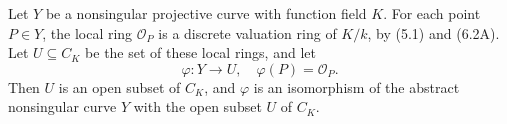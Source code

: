 Let $Y$ be a nonsingular projective curve with function field $K$. For each point $P \in Y$, the local ring $\mathcal{O}_P$ is a discrete valuation ring of $K/k$, by (5.1) and (6.2A). Let $U \subseteq C_K$ be the set of these local rings, and let
$$\varphi: Y \to U, \quad \varphi(P) = \mathcal{O}_P.$$
Then $U$ is an open subset of $C_K$, and $\varphi$ is an isomorphism of the abstract nonsingular curve $Y$ with the open subset $U$ of $C_K$.
